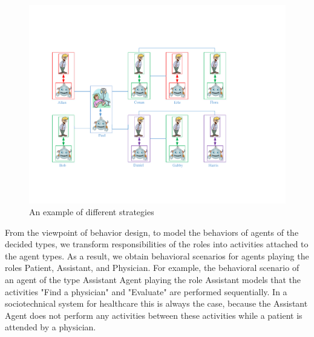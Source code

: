 \begin{figure}
\centering
\includegraphics[scale=0.7]{chap3/chap3-choosephysicianEg.pdf}
\caption{An example of different strategies}
\label{ch3:fchoosephysicianeg}
\end{figure}	
   	
From the viewpoint of behavior design, to model the behaviors of agents of the decided types, we transform responsibilities of the roles into activities attached to the agent types. As a result, we obtain behavioral scenarios for agents playing the roles Patient, Assistant, and Physician. For example, the behavioral scenario of an agent of the type Assistant Agent playing the role Assistant models that the activities "Find a physician" and "Evaluate" are performed sequentially. In a sociotechnical system for healthcare this is always the case, because the Assistant Agent does not perform any activities between these activities while a patient is attended by a physician.

